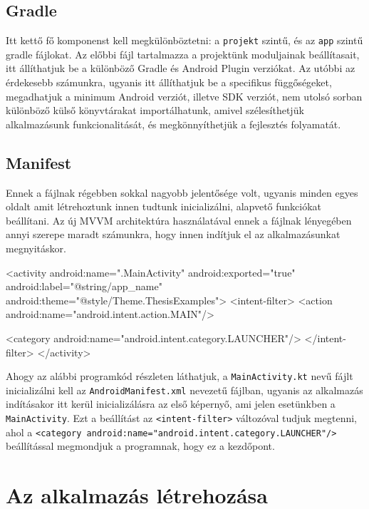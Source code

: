 \subsection{Gradle}

Itt kettő fő komponenst kell megkülönböztetni: a \texttt{projekt} szintű, és az \texttt{app} szintű gradle fájlokat. Az előbbi fájl tartalmazza a projektünk moduljainak beállítasait, itt állíthatjuk be a különböző Gradle és Android Plugin verziókat. Az utóbbi az érdekesebb számunkra, ugyanis itt állíthatjuk be a specifikus függőségeket, megadhatjuk a minimum Android verziót, illetve SDK verziót, nem utolsó sorban különböző külső könyvtárakat importálhatunk, amivel szélesíthetjük alkalmazásunk funkcionalitását, és megkönnyíthetjük a fejlesztés folyamatát.

\subsection{Manifest}

Ennek a fájlnak régebben sokkal nagyobb jelentősége volt, ugyanis minden egyes oldalt amit létrehoztunk innen tudtunk inicializálni, alapvető funkciókat beállítani. Az új MVVM architektúra használatával ennek a fájlnak lényegében annyi szerepe maradt számunkra, hogy innen indítjuk el az alkalmazásunkat megnyitáskor.
\newpage

\begin{java}[caption = {AndroidManifest.xml fájl egy részlete}]
<activity
    android:name=".MainActivity"
    android:exported="true"
    android:label="@string/app_name"
    android:theme="@style/Theme.ThesisExamples">
    <intent-filter>
  <action android:name="android.intent.action.MAIN"/>

  <category android:name="android.intent.category.LAUNCHER"/>
    </intent-filter>
</activity>
\end{java}

Ahogy az alábbi programkód részleten láthatjuk, a \texttt{MainActivity.kt} nevű fájlt inicializálni kell az \texttt{AndroidManifest.xml} nevezetű fájlban, ugyanis az alkalmazás indításakor itt kerül inicializálásra az első képernyő, ami jelen esetünkben a \texttt{MainActivity}. Ezt a beállítást az \texttt{<intent-filter>} változóval tudjuk megtenni, ahol a \texttt{<category android:name="android.intent.category.LAUNCHER"/>} beállítással megmondjuk a programnak, hogy ez a kezdőpont.

\section{Az alkalmazás létrehozása}


